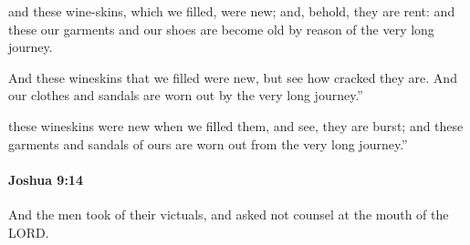 			\begin{versebox}
					\item[BHS] 
					\item[ASV] and these wine-skins, which we filled, were new; and, behold, they are rent: and these our garments and our shoes are become old by reason of the very long journey.
					\item[NIV] And these wineskins that we filled were new, but see how cracked they are. And our clothes and sandals are worn out by the very long journey.”
					\item[NRSV] these wineskins were new when we filled them, and see, they are burst; and these garments and sandals of ours are worn out from the very long journey.”
			\end{versebox}

		\paragraph{Joshua 9:14} %
			\label{JOSHUA-9-14}

			And the men took of their victuals, and asked not counsel at the mouth of the LORD.

